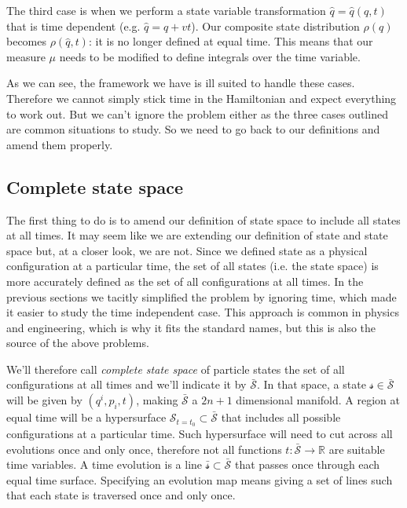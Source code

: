 \documentclass[smallextended]{svjour3}
\numberwithin{equation}{section}
\theoremstyle{definition}
\begin{document}
The third case is when we perform a state variable transformation $\hat{q}=\hat{q}(q,t)$ that is time dependent (e.g. $\hat{q}=q+vt$). Our composite state distribution $\rho(q)$ becomes $\rho(\hat{q},t)$: it is no longer defined at equal time. This means that our measure $\mu$ needs to be modified to define integrals over the time variable.

As we can see, the framework we have is ill suited to handle these cases. Therefore we cannot simply stick time in the Hamiltonian and expect everything to work out. But we can't ignore the problem either as the three cases outlined are common situations to study. So we need to go back to our definitions and amend them properly.

\subsection{Complete state space}

The first thing to do is to amend our definition of state space to include all states at all times. It may seem like we are extending our definition of state and state space but, at a closer look, we are not. Since we defined state as a physical configuration at a particular time, the set of all states (i.e. the state space) is more accurately defined as the set of all configurations at all times. In the previous sections we tacitly simplified the problem by ignoring time, which made it easier to study the time independent case. This approach is common in physics and engineering, which is why it fits the standard names, but this is also the source of the above problems.

We'll therefore call \emph{complete state space} of particle states the set of all configurations at all times and we'll indicate it by $\bar{\mathcal{S}}$. In that space, a state $\mathcal{s} \in \bar{\mathcal{S}}$ will be given by $(q^i, p_i, t)$, making $\bar{\mathcal{S}}$ a $2n+1$ dimensional manifold. A region at equal time will be a hypersurface $\mathcal{S}_{t=t_0} \subset \bar{\mathcal{S}}$ that includes all possible configurations at a particular time. Such hypersurface will need to cut across all evolutions once and only once, therefore not all functions $t : \bar{\mathcal{S}} \rightarrow \mathbb{R}$ are suitable time variables. A time evolution is a line  $\bar{\mathcal{s}} \subset \bar{\mathcal{S}}$ that passes once through each equal time surface. Specifying an evolution map means giving a set of lines such that each state is traversed once and only once.
\end{document}
